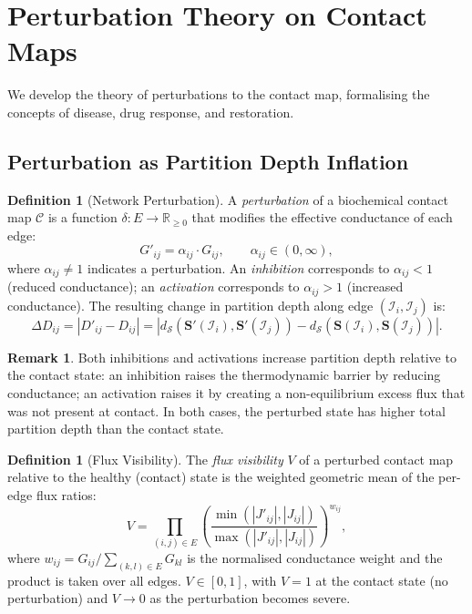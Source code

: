 \documentclass[11pt,twocolumn]{article}
\theoremstyle{plain}
\theoremstyle{definition}
\newtheorem{definition}[theorem]{Definition}
\newtheorem{remark}[theorem]{Remark}
\newcommand{\CC}{\mathcal{C}}
\newcommand{\bS}{\mathbf{S}}
\newcommand{\dS}{d_{\mathcal{S}}}
\newcommand{\reals}{\mathbb{R}}
\begin{document}
\section{Perturbation Theory on Contact Maps}
\label{sec:perturbation}

We develop the theory of perturbations to the contact map, formalising the
concepts of disease, drug response, and restoration.

\subsection{Perturbation as Partition Depth Inflation}

\begin{definition}[Network Perturbation]
\label{def:perturbation}
A \emph{perturbation} of a biochemical contact map $\CC$ is a function
$\delta: E \to \reals_{\geq 0}$ that modifies the effective conductance of each
edge:
\begin{equation}\label{eq:perturb}
  G'_{ij} = \alpha_{ij} \cdot G_{ij},
  \qquad \alpha_{ij} \in (0, \infty),
\end{equation}
where $\alpha_{ij} \neq 1$ indicates a perturbation. An \emph{inhibition}
corresponds to $\alpha_{ij} < 1$ (reduced conductance); an \emph{activation}
corresponds to $\alpha_{ij} > 1$ (increased conductance). The resulting
change in partition depth along edge $(\mathcal{I}_i, \mathcal{I}_j)$ is:
\begin{equation}\label{eq:depth_change}
  \Delta D_{ij} = |D'_{ij} - D_{ij}|
  = |\dS(\bS'(\mathcal{I}_i), \bS'(\mathcal{I}_j))
    - \dS(\bS(\mathcal{I}_i), \bS(\mathcal{I}_j))|.
\end{equation}
\end{definition}

\begin{remark}
Both inhibitions and activations increase partition depth relative to the
contact state: an inhibition raises the thermodynamic barrier by reducing
conductance; an activation raises it by creating a non-equilibrium excess flux
that was not present at contact. In both cases, the perturbed state has higher
total partition depth than the contact state.
\end{remark}

\begin{definition}[Flux Visibility]
\label{def:visibility}
The \emph{flux visibility} $V$ of a perturbed contact map relative to the
healthy (contact) state is the weighted geometric mean of the per-edge flux
ratios:
\begin{equation}\label{eq:visibility}
  V = \prod_{(i,j) \in E}
    \left(\frac{\min(|J'_{ij}|, |J_{ij}|)}{\max(|J'_{ij}|, |J_{ij}|)}\right)^{w_{ij}},
\end{equation}
where $w_{ij} = G_{ij} / \sum_{(k,l) \in E} G_{kl}$ is the normalised
conductance weight and the product is taken over all edges. $V \in [0, 1]$,
with $V = 1$ at the contact state (no perturbation) and $V \to 0$ as the
perturbation becomes severe.
\end{definition}
\end{document}
